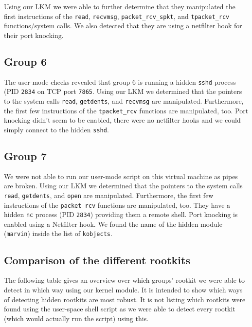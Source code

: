 \documentclass[10pt, letterpaper]{scrartcl}
\begin{document}
Using our LKM we were able to further determine that they manipulated the first instructions of the \texttt{read}, \texttt{recvmsg}, \texttt{packet\_rcv\_spkt}, and \texttt{tpacket\_rcv} functions/system calls. We also detected that they are using a netfilter hook for their port knocking.

\subsection{Group 6}
The user-mode checks revealed that group 6 is running a hidden \texttt{sshd} process (PID \texttt{2834} on TCP port \texttt{7865}.
Using our LKM we determined that the pointers to the system calls \texttt{read}, \texttt{getdents}, and \texttt{recvmsg} are manipulated.
Furthermore, the first few instructions of the \texttt{tpacket\_rcv} functions are manipulated, too.
Port knocking didn't seem to be enabled, there were no netfilter hooks and we could simply connect to the hidden \texttt{sshd}.

\subsection{Group 7}
We were not able to run our user-mode script on this virtual machine as pipes are broken.
Using our LKM we determined that the pointers to the system calls \texttt{read}, \texttt{getdents}, and \texttt{open} are manipulated.
Furthermore, the first few instructions of the \texttt{packet\_rcv} functions are manipulated, too.
They have a hidden \texttt{nc} process (PID \texttt{2834}) providing them a remote shell.
Port knocking is enabled using a Netfilter hook.
We found the name of the hidden module (\texttt{marvin}) inside the list of \texttt{kobjects}.

\subsection{Comparison of the different rootkits}
The following table gives an overview over which groups' rootkit we were able to detect in which way using our kernel module.
It is intended to show which ways of detecting hidden rootkits are most robust.
It is not listing which rootkits were found using the user-space shell script as we were able to detect every rootkit (which would actually run the script) using this.
\end{document}
